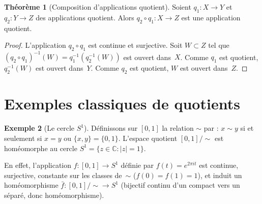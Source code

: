 \documentclass[12pt,a4paper,openany]{book}
\theoremstyle{definition}
\theoremstyle{cours}
\newtheorem{theoreme}{Théorème}[chapter]
\theoremstyle{coursnormal}
\newtheorem{exemple}[theoreme]{Exemple}
\begin{document}
\begin{theoreme}[Composition d'applications quotient]
\label{thm:composition-quotient}
Soient $q_1 \colon X \to Y$ et $q_2 \colon Y \to Z$ des applications quotient.
Alors $q_2 \circ q_1 \colon X \to Z$ est une application quotient.
\end{theoreme}

\begin{proof}
L'application $q_2 \circ q_1$ est continue et surjective. Soit $W \subset Z$ tel
que $(q_2 \circ q_1)^{-1}(W) = q_1^{-1}(q_2^{-1}(W))$ est ouvert dans~$X$.
Comme $q_1$ est quotient, $q_2^{-1}(W)$ est ouvert dans~$Y$.
Comme $q_2$ est quotient, $W$ est ouvert dans~$Z$.
\end{proof}

\section{Exemples classiques de quotients}
\label{sec:exemples-quotients}

\begin{exemple}[Le cercle $S^1$]
\label{ex:cercle-quotient}
Définissons sur $[0,1]$ la relation $\sim$ par : $x \sim y$ si et seulement si
$x = y$ ou $\{x,y\} = \{0,1\}$. L'espace quotient $[0,1]/{\sim}$ est
homéomorphe au cercle $S^1 = \{z \in \mathbb{C} : |z| = 1\}$.

En effet, l'application $f \colon [0,1] \to S^1$ définie par
$f(t) = e^{2\pi i t}$ est continue, surjective, constante sur les classes de~$\sim$
($f(0) = f(1) = 1$), et induit un homéomorphisme $\bar{f} \colon [0,1]/{\sim} \to S^1$
(bijectif continu d'un compact vers un séparé, donc homéomorphisme).
\end{exemple}
\end{document}
